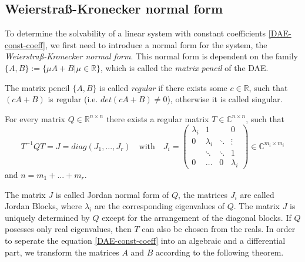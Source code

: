 \subsection{Weierstraß-Kronecker normal form}

\label{chap:Weierstraß-Kronecker normalform}
To determine the solvability of a linear system with constant coefficients \eqref{DAE-const-coeff}, we first need to introduce a normal form for the system, the \emph{Weierstraß-Kronecker normal form}. This normal form is dependent on the family $\{A,B\} := \{ \mu A+B|\mu \in \mathbb{R} \}$, which is called the  \emph{matrix pencil} of the DAE.

\begin{definition}
	The matrix pencil $\{ A,B\}$ is called \emph{regular} if there exists some $c \in \mathbb{R}$, such that $(cA+B)$ is regular (i.e. $det(cA+B) \neq 0$), otherwise it is called singular.
\end{definition}

\begin{theorem}
	For every matrix $Q \in \mathbb{R}^{n \times n}$ there exists a regular matrix $T \in \mathbb{C}^{n \times n}$, such that
	\begin{displaymath}
		T^{-1}QT = J = diag(J_1, ..., J_r) \quad \text{with} \quad J_i = 
		\left(
		\begin{matrix}
			\lambda_i & 1 & & 0 \\
			0 & \lambda_i & \ddots & \vdots \\
			& \ddots & \ddots & 1 \\
			0 & \hdots & 0 & \lambda_i
		\end{matrix}
		\right)
		\in \mathbb{C}^{m_i \times m_i}
	\end{displaymath} 
	and $n = m_1 + ... + m_r$.
\end{theorem}

The matrix $J$ is called Jordan normal form of $Q$, the matrices $J_i$ are called Jordan Blocks, where $\lambda_i$ are the corresponding eigenvalues of $Q$. The matrix $J$ is uniquely determined by $Q$ except for the arrangement of the diagonal blocks. If $Q$ posesses only real eigenvalues, then $T$ can also be chosen from the reals. \newline 
\newpage
In order to seperate the equation \eqref{DAE-const-coeff} into an algebraic and a differential part, we transform the matrices $A$ and $B$ according to the following theorem.

